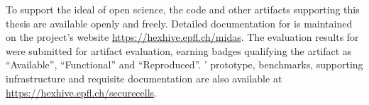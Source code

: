 To support the ideal of open science, the code and other artifacts
supporting this thesis are available openly and freely.
Detailed documentation for \midas is maintained on the project's website
\url{https://hexhive.epfl.ch/midas}.
The evaluation results for \midas were submitted for artifact evaluation,
earning badges qualifying the artifact as ``Available'', ``Functional''
and ``Reproduced''.
\seccells{}' prototype, benchmarks, supporting infrastructure and
requisite documentation are also available at 
\url{https://hexhive.epfl.ch/securecells}.


